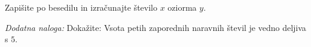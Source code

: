 \documentclass[addpoints]{exam}
\begin{document}
\begin{questions}
    

\newpage
    \question
    Zapišite po besedilu in izračunajte število $x$ oziorma $y$.
    
    \begin{solution}[3cm]

    \end{solution}

        




     \newpage

    \bonusquestion[3]
    \textit{Dodatna naloga:} Dokažite: Vsota petih zaporednih naravnih števil je vedno deljiva s $5$.

    \begin{solution}[7cm]

    \end{solution}




\end{questions}
\end{document}
